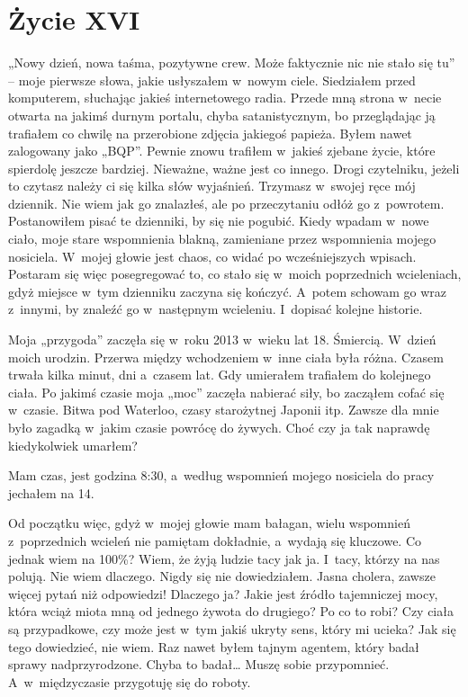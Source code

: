 \chapter{Życie XVI}

„Nowy dzień, nowa taśma, pozytywne crew. Może faktycznie nic nie stało się tu” -- moje pierwsze słowa, jakie usłyszałem w~nowym ciele. Siedziałem przed komputerem, słuchając jakieś internetowego radia. Przede mną strona w~necie otwarta na jakimś durnym portalu, chyba satanistycznym, bo przeglądając ją trafiałem co chwilę na przerobione zdjęcia jakiegoś papieża. Byłem nawet zalogowany jako „BQP”. Pewnie znowu trafiłem w~jakieś zjebane życie, które spierdolę jeszcze bardziej. Nieważne, ważne jest co innego. Drogi czytelniku, jeżeli to czytasz należy ci się kilka słów wyjaśnień. Trzymasz w~swojej ręce mój dziennik. Nie wiem jak go znalazłeś, ale po przeczytaniu odłóż go z~powrotem. Postanowiłem pisać te dzienniki, by się nie pogubić. Kiedy wpadam w~nowe ciało, moje stare wspomnienia blakną, zamieniane przez wspomnienia mojego nosiciela. W~mojej głowie jest chaos, co widać po wcześniejszych wpisach. Postaram się więc posegregować to, co stało się w~moich poprzednich wcieleniach, gdyż miejsce w~tym dzienniku zaczyna się kończyć. A~potem schowam go wraz z~innymi, by znaleźć go w~następnym wcieleniu. I~dopisać kolejne historie.

Moja „przygoda” zaczęła się w~roku 2013 w~wieku lat 18. Śmiercią. W~dzień moich urodzin. Przerwa między wchodzeniem w~inne ciała była różna. Czasem trwała kilka minut, dni a~czasem lat. Gdy umierałem trafiałem do kolejnego ciała. Po jakimś czasie moja „moc” zaczęła nabierać siły, bo zacząłem cofać się w~czasie. Bitwa pod Waterloo, czasy starożytnej Japonii itp. Zawsze dla mnie było zagadką w~jakim czasie powrócę do żywych. Choć czy ja tak naprawdę kiedykolwiek umarłem?

Mam czas, jest godzina 8:30, a~według wspomnień mojego nosiciela do pracy jechałem na 14.

Od początku więc, gdyż w~mojej głowie mam bałagan, wielu wspomnień z~poprzednich wcieleń nie pamiętam dokładnie, a~wydają się kluczowe. Co jednak wiem na 100\%? Wiem, że żyją ludzie tacy jak ja. I~tacy, którzy na nas polują. Nie wiem dlaczego. Nigdy się nie dowiedziałem. Jasna cholera, zawsze więcej pytań niż odpowiedzi! Dlaczego ja? Jakie jest źródło tajemniczej mocy, która wciąż miota mną od jednego żywota do drugiego? Po co to robi? Czy ciała są przypadkowe, czy może jest w~tym jakiś ukryty sens, który mi ucieka? Jak się tego dowiedzieć, nie wiem. Raz nawet byłem tajnym agentem, który badał sprawy nadprzyrodzone. Chyba to badał… Muszę sobie przypomnieć. A~w~międzyczasie przygotuję się do roboty.

